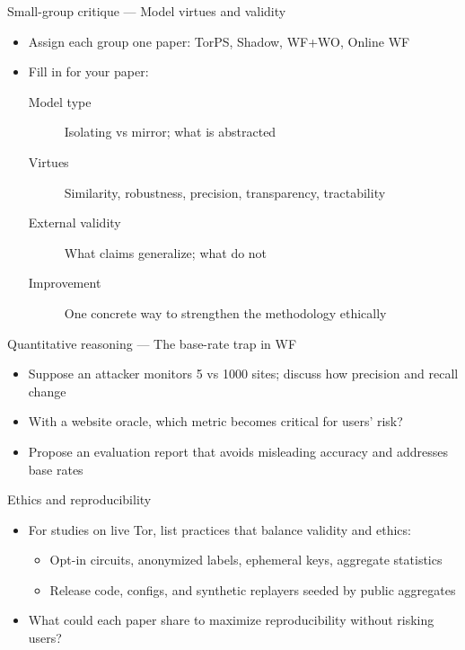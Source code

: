 \begin{frame}{Small-group critique — Model virtues and validity}
  \begin{itemize}
    \item Assign each group one paper: TorPS, Shadow, WF+WO, Online WF
    \item Fill in for your paper:
      \begin{description}
        \item[Model type] Isolating vs mirror; what is abstracted
        \item[Virtues] Similarity, robustness, precision, transparency, tractability
        \item[External validity] What claims generalize; what do not
        \item[Improvement] One concrete way to strengthen the methodology ethically
      \end{description}
  \end{itemize}
\end{frame}

\begin{frame}{Quantitative reasoning — The base-rate trap in WF}
  \begin{itemize}
    \item Suppose an attacker monitors 5 vs 1000 sites; discuss how precision and recall change
    \item With a website oracle, which metric becomes critical for users’ risk?
    \item Propose an evaluation report that avoids misleading accuracy and addresses base rates
  \end{itemize}
\end{frame}

\begin{frame}{Ethics and reproducibility}
  \begin{itemize}
    \item For studies on live Tor, list practices that balance validity and ethics:
      \begin{itemize}
        \item Opt-in circuits, anonymized labels, ephemeral keys, aggregate statistics
        \item Release code, configs, and synthetic replayers seeded by public aggregates
      \end{itemize}
    \item What could each paper share to maximize reproducibility without risking users?
  \end{itemize}
\end{frame}

